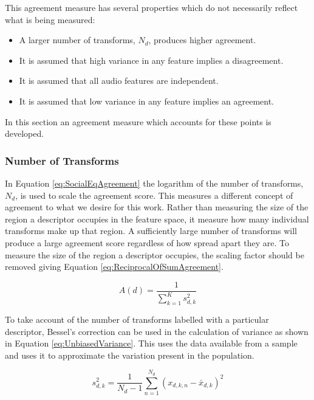 		This agreement measure has several properties which do not necessarily reflect what is being measured:

		\begin{itemize}
			\item A larger number of transforms, $N_{d}$, produces higher agreement.
			\item It is assumed that high variance in any feature implies a disagreement. 
			\item It is assumed that all audio features are independent. 
			\item It is assumed that low variance in any feature implies an agreement. 
		\end{itemize}

		In this section an agreement measure which accounts for these points is developed.

		\subsubsection*{Number of Transforms}
			In Equation \ref{eq:SocialEqAgreement} the logarithm of the number of transforms, $N_{d}$, is used
			to scale the agreement score. This measures a different concept of agreement to what we desire for
			this work. Rather than measuring the size of the region a descriptor occupies in the feature space,
			it measure how many individual transforms make up that region. A sufficiently large number of
			transforms will produce a large agreement score regardless of how spread apart they are. To measure
			the size of the region a descriptor occupies, the scaling factor should be removed giving Equation
			\ref{eq:ReciprocalOfSumAgreement}.

			\begin{equation}
				A(d) = \frac{1}{\sum_{k = 1}^{K} s_{d,k}^{2}}
				\label{eq:ReciprocalOfSumAgreement}
			\end{equation}

			To take account of the number of transforms labelled with a particular descriptor, Bessel's
			correction can be used in the calculation of variance as shown in Equation
			\ref{eq:UnbiasedVariance}. This uses the data available from a sample and uses it to approximate
			the variation present in the population.

			\begin{equation}
				s_{d,k}^{2} = \frac{1}{N_{d} - 1} \sum_{n = 1}^{N_{d}} (x_{d,k,n} - \bar{x}_{d,k})^{2}
				\label{eq:UnbiasedVariance}
			\end{equation}

